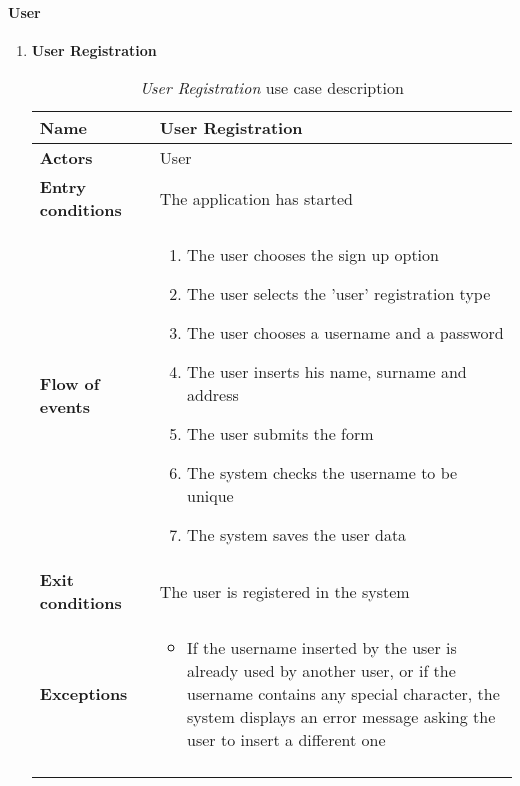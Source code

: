 		\paragraph{User}
		\begin{enumerate}
			\item \textbf{User Registration} 
				\begin{longtable}{p{0.25\linewidth}p{0.75\linewidth}}
					\toprule
					\textbf{Name} & \textbf{User Registration} \\
					\midrule
					\textbf{Actors} & User \\
					\midrule
					\textbf{Entry conditions} & The application has started \\
					\midrule
					\textbf{Flow of events} & 
					\begin{enumerate}
						\item The user chooses the sign up option
						\item The user selects the 'user' registration type
						\item The user chooses a username and a password
						\item The user inserts his name, surname and address
						\item The user submits the form
						\item The system checks the username to be unique
						\item The system saves the user data
					\end{enumerate} \\
					\midrule
					\textbf{Exit conditions} & The user is registered in the system\\
					\midrule
					\textbf{Exceptions} & 
					\begin{itemize}
						\item If the username inserted by the user is already used by another user, or if the username contains any special character, the system displays an error message asking the user to insert a different one
					\end{itemize} \\
					\bottomrule
					\caption{\emph{User Registration} use case description}
				\end{longtable}
			

\end{enumerate}
